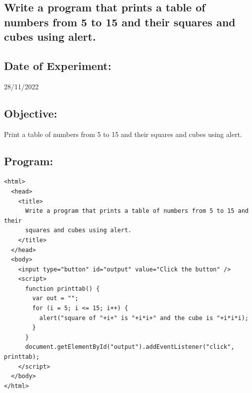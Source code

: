 \documentclass[12pt, a4paper]{article}
\begin{document}
\pagebreak

\begin{tcolorbox}
  \section{Write a program that prints a table of numbers from 5 to 15 and their squares and cubes using alert.}
\end{tcolorbox}
\subsection*{Date of Experiment:}
28/11/2022
\subsection*{Objective:}
Print a table of numbers from 5 to 15 and their squares and cubes using alert.

\subsection*{Program:}
\begin{lstlisting}
<html>
  <head>
    <title>
      Write a program that prints a table of numbers from 5 to 15 and their
      squares and cubes using alert.
    </title>
  </head>
  <body>
    <input type="button" id="output" value="Click the button" />
    <script>
      function printtab() {
        var out = "";
        for (i = 5; i <= 15; i++) {
          alert("square of "+i+" is "+i*i+" and the cube is "+i*i*i);
        }
      }
      document.getElementById("output").addEventListener("click", printtab);
    </script>
  </body>
</html>
\end{lstlisting}
\pagebreak
\end{document}
